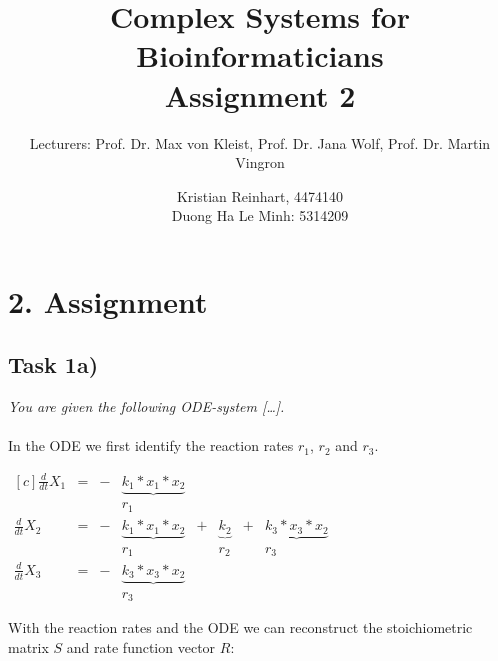 \documentclass[]{scrartcl}
\title{Complex Systems for Bioinformaticians \\ \vspace{2mm} Assignment 2 \\ \vspace{2mm}}
\subtitle{Lecturers: Prof. Dr. Max von Kleist, Prof. Dr. Jana Wolf, Prof. Dr. Martin Vingron}
\author{Kristian Reinhart, 4474140 \\ Duong Ha Le Minh: 5314209}
\begin{document}
\maketitle




\section*{2. Assignment}

\subsection*{Task 1a)}

\textit{You are given the following ODE-system [\dots].}
\\
\\
In the ODE we first identify the reaction rates $r_1$, $r_2$ and $r_3$.


\begin{center}
\noindent \begin{minipage}{.5\linewidth}
$
\begin{matrix*}[c]
	\frac{d}{dt} X_1 & = & - & \underbrace{k_1 * x_1 * x_2}	&	& 				   &   & \\ 
					 &   &   & 							r_1 &   &				   &   & \\
	\frac{d}{dt} X_2 & = & - & \underbrace{k_1 * x_1 * x_2}	& + & \underbrace{k_2} & + & \underbrace{k_3 * x_3 * x_2} \\
					 &   &   & 							r_1 &   &			   r_2 &   & 						  r_3 \\
	\frac{d}{dt} X_3 & = & - & \underbrace{k_3 * x_3 * x_2} &   &				   &   & \\
					 &   &   & 							r_3 &   &				   &   & 
\end{matrix*}
$
\end{minipage}
\end{center}

\noindent With the reaction rates and the ODE we can reconstruct the stoichiometric matrix $S$ and rate function vector $R$:
\end{document}

